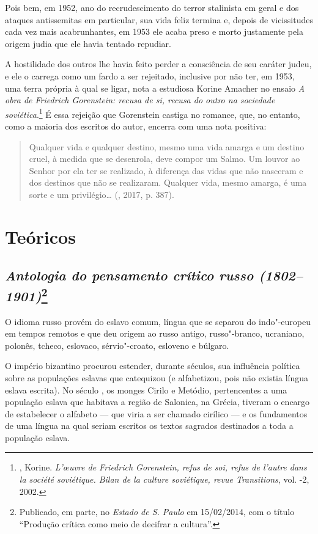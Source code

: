 Pois bem, em 1952, ano do recrudescimento do terror stalinista em geral
e dos ataques antissemitas em particular, sua vida feliz termina e,
depois de vicissitudes cada vez mais acabrunhantes, em 1953 ele acaba
preso e morto justamente pela origem judia que ele havia tentado
repudiar.

A hostilidade dos outros lhe havia feito perder a consciência de seu
caráter judeu, e ele o carrega como um fardo a ser rejeitado,
inclusive por não ter, em 1953, uma terra própria à qual se ligar, nota
a estudiosa Korine Amacher no ensaio \emph{A obra de Friedrich
Gorenstein: recusa de si, recusa do outro na sociedade 
soviética}.\footnote{, Korine. \emph{L’œuvre de
 Friedrich Gorenstein, refus de soi, refus de l'autre dans la société
 soviétique. Bilan de la culture soviétique, revue Transitions}, vol.
 -2, 2002.} É essa rejeição que Gorenstein castiga no romance, que, no entanto, como a maioria dos escritos do autor, encerra com
uma nota positiva: 

\begin{quotation}
Qualquer vida e qualquer destino, mesmo uma
vida amarga e um destino cruel, à medida que se desenrola, deve compor um
Salmo. Um louvor ao Senhor por ela ter se realizado, à diferença das vidas
que não nasceram e dos destinos que não se realizaram. Qualquer vida,
mesmo amarga, é uma sorte e um privilégio\ldots{} (, 2017, p. 387).
\end{quotation}

\part{Teóricos}

\chapter{\emph{Antologia do pensamento crítico russo (1802--1901)}\footnote{Publicado, em parte, no \emph{Estado de S. Paulo} em 15/02/2014, com o título ``Produção crítica como meio de decifrar a cultura''.}}
\label{pensamentocritico}

O idioma russo provém do eslavo comum, língua que se separou do
indo"-europeu em tempos remotos e que deu origem ao russo antigo,
russo"-branco, ucraniano, polonês, tcheco, eslovaco, sérvio"-croato,
esloveno e búlgaro.

O império bizantino procurou estender, durante séculos, sua influência
política sobre as populações eslavas que catequizou (e alfabetizou, pois
não existia língua eslava escrita). No século , os monges Cirilo e
Metódio, pertencentes a uma população eslava que habitava a região de
Salonica, na Grécia, tiveram o encargo de estabelecer o alfabeto --- que
viria a ser chamado cirílico --- e os fundamentos de uma língua na qual
seriam escritos os textos sagrados destinados a toda a população eslava.


